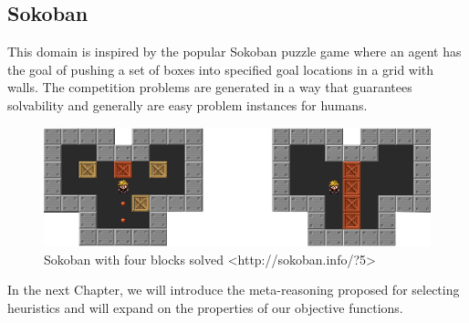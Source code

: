 \subsection{Sokoban}
This domain is inspired by the popular Sokoban puzzle game where an agent has the goal of pushing a set of boxes into specified goal locations in a grid with walls. The competition problems are generated in a way that guarantees solvability and generally are easy problem instances for humans.


\begin{figure}[!htb]
\begin{center}
  \includegraphics[width=12cm,scale=0.5]{images/sokoban_star_end}
\end{center}
\caption{Sokoban with four blocks solved <http://sokoban.info/?5>}\label{fig:img_sokoban_solved}
\end{figure}




\bigskip

In the next Chapter, we will introduce the meta-reasoning proposed for selecting heuristics and will expand on the properties of our objective functions.\\

\clearpage